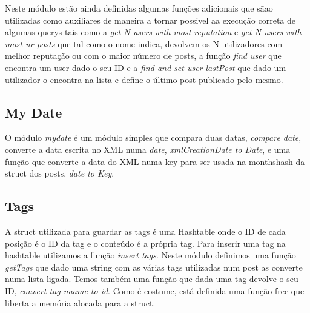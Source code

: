 \documentclass[a4paper]{article}
\begin{document}
	Neste módulo estão ainda definidas algumas funções adicionais que sãao utilizadas como auxiliares de maneira a tornar possivel aa execução correta de algumas querys tais como a \emph{get N users with most reputation} e \emph{get N users with most nr posts} que tal como o nome indica, devolvem os N utilizadores com melhor reputação ou com o maior número de posts, a função \emph{find user} que encontra um user dado o seu ID e a \emph{find and set user lastPost} que dado um utilizador o encontra na lista e define o último post publicado pelo mesmo.


\subsection{My Date}

	O módulo \emph{mydate} é um módulo simples que compara duas datas, \emph{compare date}, converte a data escrita no XML numa \emph{date}, \emph{xmlCreationDate to Date}, e uma função que converte a data do XML numa key para ser usada na monthshash da struct dos posts, \emph{date to Key}.


\subsection{Tags}

	A struct utilizada para guardar as tags é uma Hashtable onde o ID de cada posição é o ID da tag e o conteúdo é a própria tag. Para inserir uma tag na hashtable utilizamos a função \emph{insert tags}. Neste módulo definimos uma função \emph{getTags} que dado uma string com as várias tags utilizadas num post as converte numa lista ligada. Temos também uma função que dada uma tag devolve o seu ID, \emph{convert tag naame to id}. Como é costume, está definida uma função free que liberta a memória alocada para a struct.
\end{document}
